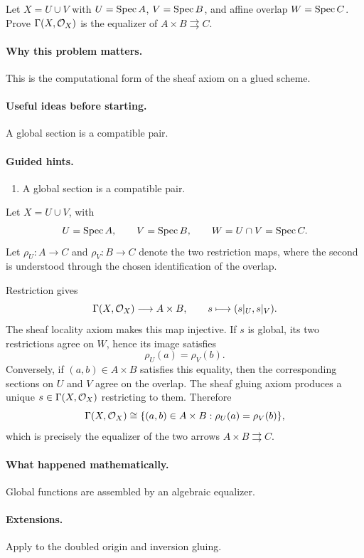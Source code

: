 \begin{problem}\label{prob:vi20-p15}
Let $X=U\cup V$ with $U=\operatorname{Spec} A$, $V=\operatorname{Spec} B$, and affine overlap $W=\operatorname{Spec} C$. Prove $\Gamma(X,\mathcal O_X)$ is the equalizer of $A\times B\rightrightarrows C$.
\end{problem}

\ifdefined\FullProblemDossiers
\paragraph{Why this problem matters.}
This is the computational form of the sheaf axiom on a glued scheme.

\paragraph{Useful ideas before starting.}
A global section is a compatible pair.

\paragraph{Guided hints.}
\begin{enumerate}
\item A global section is a compatible pair.
\end{enumerate}

\begin{solution}
Let $X=U\cup V$, with
\[
U=\operatorname{Spec} A,\qquad V=\operatorname{Spec} B,\qquad W=U\cap V=\operatorname{Spec} C.
\]
Let $\rho_U:A\to C$ and $\rho_V:B\to C$ denote the two restriction maps, where the second is understood through the chosen identification of the overlap.

Restriction gives
\[
\Gamma(X,\mathcal O_X)\longrightarrow A\times B,
\qquad s\longmapsto(s|_U,s|_V).
\]
The sheaf locality axiom makes this map injective.  If $s$ is global, its two restrictions agree on $W$, hence its image satisfies
\[
\rho_U(a)=\rho_V(b).
\]
Conversely, if $(a,b)\in A\times B$ satisfies this equality, then the corresponding sections on $U$ and $V$ agree on the overlap.  The sheaf gluing axiom produces a unique $s\in\Gamma(X,\mathcal O_X)$ restricting to them.  Therefore
\[
\Gamma(X,\mathcal O_X)
\cong
\{(a,b)\in A\times B:\rho_U(a)=\rho_V(b)\},
\]
which is precisely the equalizer of the two arrows $A\times B\rightrightarrows C$.
\end{solution}


\paragraph{What happened mathematically.}
Global functions are assembled by an algebraic equalizer.

\paragraph{Extensions.}
Apply to the doubled origin and inversion gluing.
\fi
